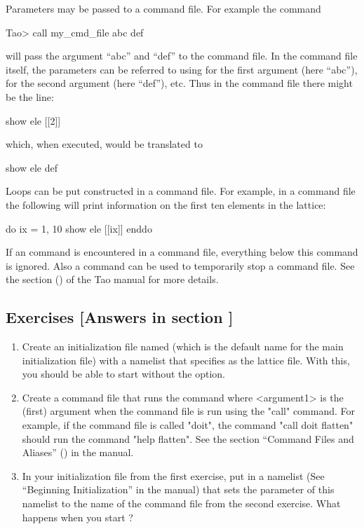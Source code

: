 \documentclass{hitec}     %
\begin{document}
Parameters may be passed to a command file. For example the command
\begin{code}
Tao> call my_cmd_file abc def
\end{code}
will pass the argument ``abc'' and ``def'' to the command file. In the command file itself, the parameters
can be referred to using  for the first argument (here ``abc''),  for
the second argument (here ``def''), etc. Thus in the command file there might be the line:
\begin{code}
show ele [[2]]
\end{code}
which, when executed, would be translated to
\begin{code}
show ele def
\end{code}

Loops can be put constructed in a command file. For example, in a command file the following
will print information on the first ten elements in the lattice:
\begin{code}
do ix = 1, 10
  show ele [[ix]]
enddo
\end{code}

If an  command is encountered in a command file, everything below this command is
ignored. Also a  command can be used to temporarily stop a command file. See the
 section () of the Tao manual for more details.

\subsection{Exercises [Answers in section ]}
\label{s:start.ex}

\begin{enumerate}[label=\thesection.\arabic{enumi}]
\item
Create an initialization file named  (which is the default name for the main
initialization file) with a  namelist that specifies  as the
lattice file. With this, you should be able to start \tao without the  option.
%
\item
Create a command file that runs the command  where <argument1> is the (first)
argument when the command file is run using the "call" command. For example, if the command file is
called "doit", the command "call doit flatten" should run the command "help flatten". See the
section ``Command Files and Aliases'' () in the \tao manual.
%
\item
In your  initialization file from the first exercise, put in a  namelist
(See  ``Beginning Initialization'' in the \tao manual) that sets the 
parameter of this namelist to the name of the command file from the second exercise. What happens when
you start \tao?
\end{enumerate}
\end{document}

